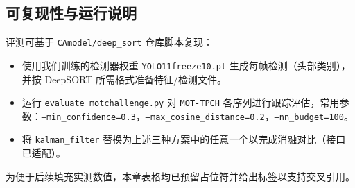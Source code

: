 \subsection{可复现性与运行说明}
评测可基于 \texttt{CAmodel/deep\_sort} 仓库脚本复现：
\begin{itemize}
    \item 使用我们训练的检测器权重 \texttt{YOLO11freeze10.pt} 生成每帧检测（头部类别），并按 DeepSORT 所需格式准备特征/检测文件。
    \item 运行 \texttt{evaluate\_motchallenge.py} 对 \texttt{MOT-TPCH} 各序列进行跟踪评估，常用参数：\texttt{--min\_confidence=0.3}，\texttt{--max\_cosine\_distance=0.2}，\texttt{--nn\_budget=100}。
    \item 将 \texttt{kalman\_filter} 替换为上述三种方案中的任意一个以完成消融对比（接口已适配）。
\end{itemize}

为便于后续填充实测数值，本章表格均已预留占位符并给出标签以支持交叉引用。
\fi